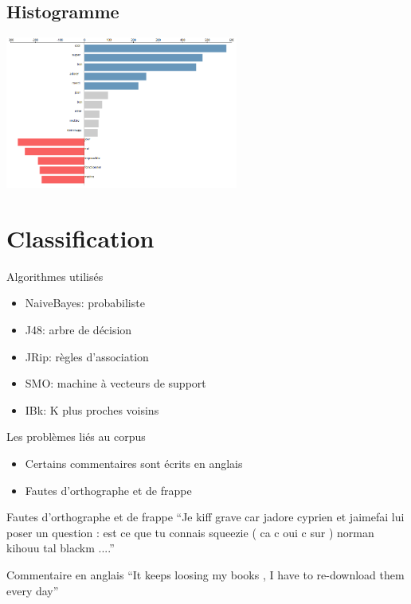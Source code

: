 \documentclass{beamer}
\begin{document}
\subsection{Histogramme}
\begin{frame}
	\includegraphics[height=5cm]{imgs/visu2.png}
\end{frame}

\section{Classification}
\begin{frame}
	\begin{block}{Algorithmes utilisés}
		\begin{itemize}
			\item NaiveBayes: probabiliste
			\item J48: arbre de décision
			\item JRip: règles d'association
			\item SMO: machine à vecteurs de support
			\item IBk: K plus proches voisins
		\end{itemize}
	\end{block}
\end{frame}

\begin{frame}
	\begin{block}{Les problèmes liés au corpus}
		\begin{itemize}
			\item Certains commentaires sont écrits en anglais
			\item Fautes d'orthographe et de frappe
		\end{itemize}
	\end{block}
\end{frame}

\begin{frame}
	\begin{exampleblock}{Fautes d'orthographe et de frappe}
		``Je kiff grave car jadore cyprien et jaimefai lui poser un question : est ce que tu connais squeezie ( ca c oui c sur ) norman kihouu tal blackm ....''\\
		
	\end{exampleblock}
	
	\begin{exampleblock}{Commentaire en anglais}
		``It keeps loosing my books , I have to re-download them every day''
	\end{exampleblock}

\end{frame}
\end{document}

